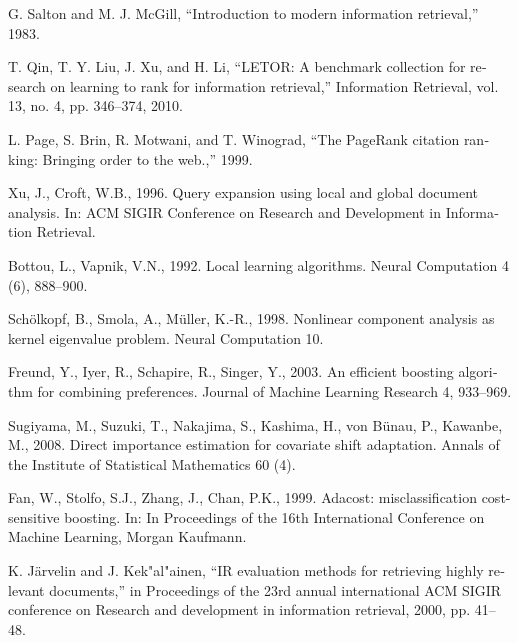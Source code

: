 \documentclass{article}
\begin{document}
\renewcommand*{\refname}{\section{منابع}}
\begin{thebibliography}{9}
\begin{latin}

G. Salton and M. J. McGill, “Introduction to modern information retrieval,” 1983.

T. Qin, T. Y. Liu, J. Xu, and H. Li, “LETOR: A benchmark collection for research on learning to rank for information retrieval,” Information Retrieval, vol. 13, no. 4, pp. 346–374, 2010.

L. Page, S. Brin, R. Motwani, and T. Winograd, “The PageRank citation ranking: Bringing order to the web.,” 1999.

Xu, J., Croft, W.B., 1996. Query expansion using local and global document analysis. In: ACM SIGIR Conference on Research and Development in Information Retrieval.

Bottou, L., Vapnik, V.N., 1992. Local learning algorithms. Neural Computation 4 (6), 888–900.

Schölkopf, B., Smola, A., Müller, K.-R., 1998. Nonlinear component analysis as kernel eigenvalue problem. Neural Computation 10.

Freund, Y., Iyer, R., Schapire, R., Singer, Y., 2003. An efficient boosting algorithm for combining preferences. Journal of Machine Learning Research 4, 933–969.

Sugiyama, M., Suzuki, T., Nakajima, S., Kashima, H., von Bünau, P., Kawanbe, M., 2008. Direct importance estimation for covariate shift adaptation. Annals of the Institute of Statistical Mathematics 60 (4).

Fan, W., Stolfo, S.J., Zhang, J., Chan, P.K., 1999. Adacost: misclassification cost-sensitive boosting. In: In Proceedings of the 16th International Conference on Machine Learning, Morgan Kaufmann.

K. Järvelin and J. Kek"al"ainen, “IR evaluation methods for retrieving highly relevant documents,” in Proceedings of the 23rd annual international ACM SIGIR conference on Research and development in information retrieval, 2000, pp. 41–48.

\end{latin}
\end{thebibliography}
\end{document}
